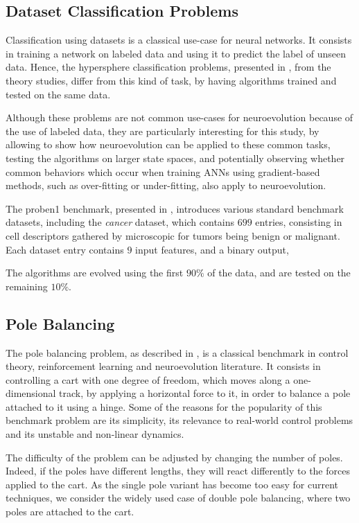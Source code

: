 \subsection{Dataset Classification Problems}

Classification using datasets is a classical use-case for neural networks. It consists in training a network on labeled data and using it to
predict the label of unseen data. Hence, the hypersphere classification problems, presented in , from the
theory studies, differ from this kind of task, by having algorithms trained and tested on the same data.

Although these problems are not common use-cases for neuroevolution because of the use of labeled data,
they are particularly interesting for this study, by allowing to show how neuroevolution can be applied to these common tasks, testing
the algorithms on larger state spaces, and potentially observing whether common behaviors which occur when training ANNs using gradient-based methods,
such as over-fitting or under-fitting, also apply to neuroevolution.

The proben1 benchmark, presented in \cite{proben}, introduces various standard benchmark datasets, including the \textit{cancer} dataset, which
contains $699$ entries, consisting in cell descriptors gathered by microscopic for tumors being benign or malignant.
Each dataset entry contains $9$ input features, and a binary output,

The algorithms are evolved using the first $90\%$ of the data, and are tested on the remaining $10\%$.

\subsection{Pole Balancing}

The pole balancing problem, as described in \cite{pole_balancing}, is a classical benchmark in control theory, reinforcement learning and neuroevolution literature.
It consists in controlling a cart with one degree of freedom, which moves along a one-dimensional track, by applying a horizontal force to it, in order to balance a pole attached to it using a hinge.
Some of the reasons for the popularity of this benchmark problem are its simplicity, its relevance to real-world control problems and its unstable and non-linear dynamics.


The difficulty of the problem can be adjusted by changing the number of poles. Indeed, if the poles have different lengths, they will react differently to the forces applied to the cart.
As the single pole variant has become too easy for current techniques, we consider the widely used case of double pole balancing, where two poles are attached to the cart.

